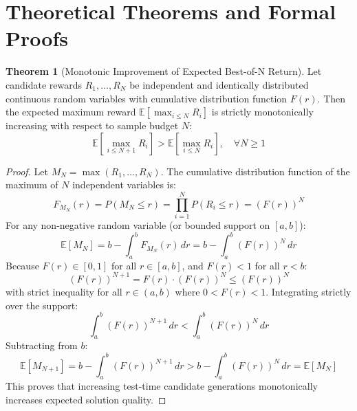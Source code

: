 \documentclass[11pt,a4paper]{article}
\theoremstyle{definition}
\newtheorem{theorem}{\textbf{Theorem}}[section]
\begin{document}
\section{Theoretical Theorems and Formal Proofs}

\begin{theorem}[Monotonic Improvement of Expected Best-of-N Return]
Let candidate rewards $R_1, \dots, R_N$ be independent and identically distributed continuous random variables with cumulative distribution function $F(r)$. Then the expected maximum reward $\mathbb{E}[\max_{i \le N} R_i]$ is strictly monotonically increasing with respect to sample budget $N$:
{\boldmath
\begin{equation}
\mathbb{E}\left[ \max_{i \le N+1} R_i \right] > \mathbb{E}\left[ \max_{i \le N} R_i \right], \quad \forall N \ge 1
\end{equation}
}
\end{theorem}

\begin{proof}
Let $M_N = \max(R_1, \dots, R_N)$.
The cumulative distribution function of the maximum of $N$ independent variables is:
{\boldmath
\begin{equation}
F_{M_N}(r) = P(M_N \le r) = \prod_{i=1}^N P(R_i \le r) = (F(r))^N
\end{equation}
}
For any non-negative random variable (or bounded support on $[a, b]$):
{\boldmath
\begin{equation}
\mathbb{E}[M_N] = b - \int_a^b F_{M_N}(r) \, dr = b - \int_a^b (F(r))^N \, dr
\end{equation}
}
Because $F(r) \in [0, 1]$ for all $r \in [a, b]$, and $F(r) < 1$ for all $r < b$:
{\boldmath
\begin{equation}
(F(r))^{N+1} = F(r) \cdot (F(r))^N \le (F(r))^N
\end{equation}
}
with strict inequality for all $r \in (a, b)$ where $0 < F(r) < 1$.
Integrating strictly over the support:
{\boldmath
\begin{equation}
\int_a^b (F(r))^{N+1} \, dr < \int_a^b (F(r))^N \, dr
\end{equation}
}
Subtracting from $b$:
{\boldmath
\begin{equation}
\mathbb{E}[M_{N+1}] = b - \int_a^b (F(r))^{N+1} \, dr > b - \int_a^b (F(r))^N \, dr = \mathbb{E}[M_N]
\end{equation}
}
This proves that increasing test-time candidate generations monotonically increases expected solution quality.
\end{proof}
\end{document}
